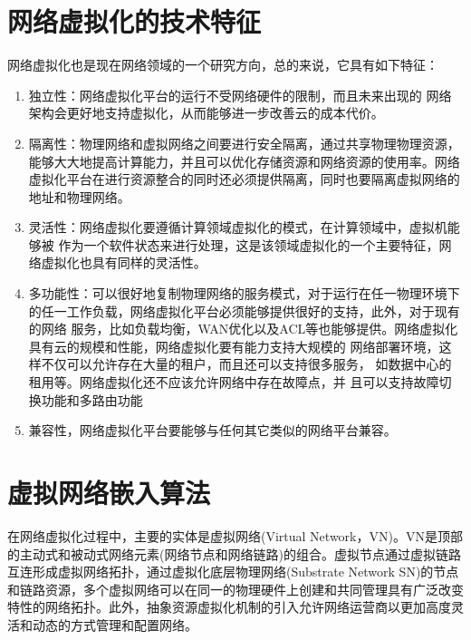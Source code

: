 



\section{网络虚拟化的技术特征}
网络虚拟化也是现在网络领域的一个研究方向，总的来说，它具有如下特征\cite{chowdhury2010survey}：
\begin{enumerate}
  \item 独立性：网络虚拟化平台的运行不受网络硬件的限制，而且未来出现的 网络架构会更好地支持虚拟化，从而能够进一步改善云的成本代价。
  \item 隔离性：物理网络和虚拟网络之间要进行安全隔离，通过共享物理物理资源，能够大大地提高计算能力，并且可以优化存储资源和网络资源的使用率。网络虚拟化平台在进行资源整合的同时还必须提供隔离，同时也要隔离虚拟网络的地址和物理网络。
  \item  灵活性：网络虚拟化要遵循计算领域虚拟化的模式，在计算领域中，虚拟机能够被 作为一个软件状态来进行处理，这是该领域虚拟化的一个主要特征，网络虚拟化也具有同样的灵活性。
  \item 多功能性：可以很好地复制物理网络的服务模式，对于运行在任一物理环境下的任一工作负载，网络虚拟化平台必须能够提供很好的支持，此外，对于现有的网络 服务，比如负载均衡，WAN优化以及ACL等也能够提供。网络虚拟化具有云的规模和性能，网络虚拟化要有能力支持大规模的 网络部署环境，这样不仅可以允许存在大量的租户，而且还可以支持很多服务， 如数据中心的租用等。网络虚拟化还不应该允许网络中存在故障点，并 且可以支持故障切换功能和多路由功能
  \item 兼容性，网络虚拟化平台要能够与任何其它类似的网络平台兼容。
\end{enumerate}


\section{虚拟网络嵌入算法}
在网络虚拟化过程中，主要的实体是虚拟网络(Virtual Network，VN)。VN是顶部的主动式和被动式网络元素(网络节点和网络链路)的组合。虚拟节点通过虚拟链路互连形成虚拟网络拓扑，通过虚拟化底层物理网络(Substrate Network SN)的节点和链路资源，多个虚拟网络可以在同一的物理硬件上创建和共同管理具有广泛改变特性的网络拓扑。此外，抽象资源虚拟化机制的引入允许网络运营商以更加高度灵活和动态的方式管理和配置网络。

